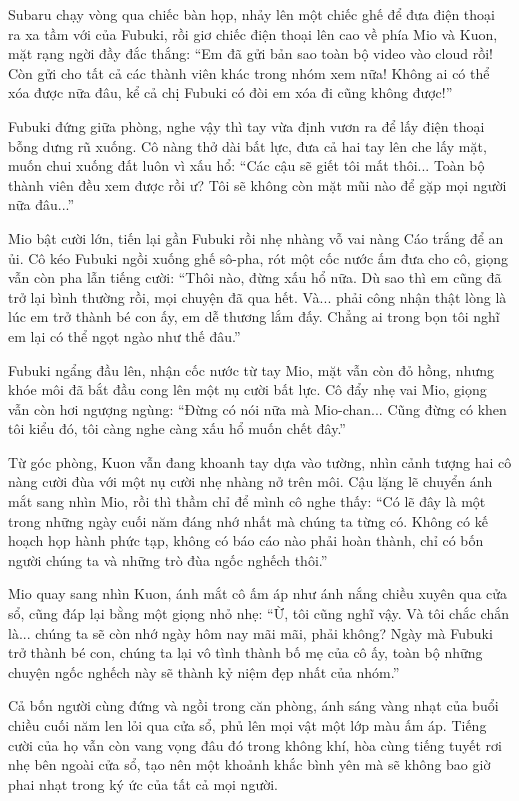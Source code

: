 \documentclass[../main.tex]{subfiles}
\begin{document}
Subaru chạy vòng qua chiếc bàn họp, nhảy lên một chiếc ghế để đưa điện thoại ra xa tầm với của Fubuki, rồi giơ chiếc điện thoại lên cao về phía Mio và Kuon, mặt rạng ngời đầy đắc thắng: ``Em đã gửi bản sao toàn bộ video vào cloud rồi! Còn gửi cho tất cả các thành viên khác trong nhóm xem nữa! Không ai có thể xóa được nữa đâu, kể cả chị Fubuki có đòi em xóa đi cũng không được!''

Fubuki đứng giữa phòng, nghe vậy thì tay vừa định vươn ra để lấy điện thoại bỗng dưng rũ xuống. Cô nàng thở dài bất lực, đưa cả hai tay lên che lấy mặt, muốn chui xuống đất luôn vì xấu hổ: ``Các cậu sẽ giết tôi mất thôi... Toàn bộ thành viên đều xem được rồi ư? Tôi sẽ không còn mặt mũi nào để gặp mọi người nữa đâu...''

Mio bật cười lớn, tiến lại gần Fubuki rồi nhẹ nhàng vỗ vai nàng Cáo trắng để an ủi. Cô kéo Fubuki ngồi xuống ghế sô-pha, rót một cốc nước ấm đưa cho cô, giọng vẫn còn pha lẫn tiếng cười: ``Thôi nào, đừng xấu hổ nữa. Dù sao thì em cũng đã trở lại bình thường rồi, mọi chuyện đã qua hết. Và... phải công nhận thật lòng là lúc em trở thành bé con ấy, em dễ thương lắm đấy. Chẳng ai trong bọn tôi nghĩ em lại có thể ngọt ngào như thế đâu.''

Fubuki ngẩng đầu lên, nhận cốc nước từ tay Mio, mặt vẫn còn đỏ hồng, nhưng khóe môi đã bắt đầu cong lên một nụ cười bất lực. Cô đẩy nhẹ vai Mio, giọng vẫn còn hơi ngượng ngùng: ``Đừng có nói nữa mà Mio-chan... Cũng đừng có khen tôi kiểu đó, tôi càng nghe càng xấu hổ muốn chết đây.''

Từ góc phòng, Kuon vẫn đang khoanh tay dựa vào tường, nhìn cảnh tượng hai cô nàng cười đùa với một nụ cười nhẹ nhàng nở trên môi. Cậu lặng lẽ chuyển ánh mắt sang nhìn Mio, rồi thì thầm chỉ để mình cô nghe thấy: ``Có lẽ đây là một trong những ngày cuối năm đáng nhớ nhất mà chúng ta từng có. Không có kế hoạch họp hành phức tạp, không có báo cáo nào phải hoàn thành, chỉ có bốn người chúng ta và những trò đùa ngốc nghếch thôi.''

Mio quay sang nhìn Kuon, ánh mắt cô ấm áp như ánh nắng chiều xuyên qua cửa sổ, cũng đáp lại bằng một giọng nhỏ nhẹ: ``Ừ, tôi cũng nghĩ vậy. Và tôi chắc chắn là... chúng ta sẽ còn nhớ ngày hôm nay mãi mãi, phải không? Ngày mà Fubuki trở thành bé con, chúng ta lại vô tình thành bố mẹ của cô ấy, toàn bộ những chuyện ngốc nghếch này sẽ thành kỷ niệm đẹp nhất của nhóm.''

Cả bốn người cùng đứng và ngồi trong căn phòng, ánh sáng vàng nhạt của buổi chiều cuối năm len lỏi qua cửa sổ, phủ lên mọi vật một lớp màu ấm áp. Tiếng cười của họ vẫn còn vang vọng đâu đó trong không khí, hòa cùng tiếng tuyết rơi nhẹ bên ngoài cửa sổ, tạo nên một khoảnh khắc bình yên mà sẽ không bao giờ phai nhạt trong ký ức của tất cả mọi người.
\end{document}
